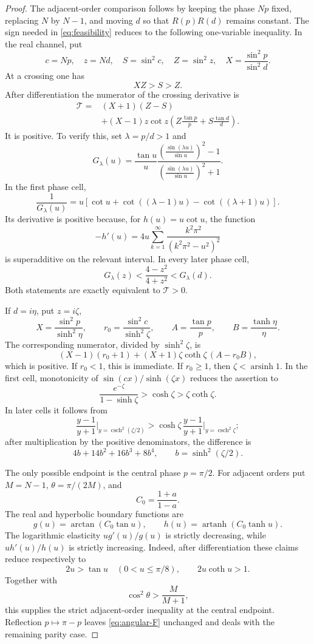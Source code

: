 \documentclass[11pt]{article}
\begin{document}
\begin{proof}
The adjacent-order comparison follows by keeping the phase \(Np\) fixed,
replacing \(N\) by \(N-1\), and moving \(d\) so that \(R(p)R(d)\) remains
constant.  The sign needed in \eqref{eq:feasibility} reduces to the following
one-variable inequality.  In the real channel, put
\[
c=Np,\quad z=Nd,\quad
S=\sin^2c,\quad Z=\sin^2z,\quad
X=\frac{\sin^2p}{\sin^2d}.
\]
At a crossing one has
\[
XZ>S>Z.
\]
After differentiation the numerator of the crossing derivative is
\[
\begin{aligned}
\mathcal T={}&(X+1)(Z-S)\\
&+(X-1)z\cot z
\left(
Z\frac{\tan p}{p}
+
S\frac{\tan d}{d}
\right).
\end{aligned}
\tag{15}\label{eq:T-real}
\]
It is positive.  To verify this, set \(\lambda=p/d>1\) and
\[
G_\lambda(u)
=
\frac{\tan u}{u}
\frac{\left(\frac{\sin(\lambda u)}{\sin u}\right)^2-1}
{\left(\frac{\sin(\lambda u)}{\sin u}\right)^2+1}.
\]
In the first phase cell,
\[
\frac1{G_\lambda(u)}
=
u\left[
\cot u+\cot((\lambda-1)u)-\cot((\lambda+1)u)
\right].
\]
Its derivative is positive because, for \(h(u)=u\cot u\), the function
\[
-h'(u)
=
4u\sum_{k=1}^{\infty}
\frac{k^2\pi^2}{(k^2\pi^2-u^2)^2}
\]
is superadditive on the relevant interval.  In every later phase cell,
\[
G_\lambda(z)
<
\frac{4-z^2}{4+z^2}
<
G_\lambda(d).
\]
Both statements are exactly equivalent to \(\mathcal T>0\).

If \(d=i\eta\), put \(z=i\zeta\),
\[
X=\frac{\sin^2p}{\sinh^2\eta},
\qquad
r_0=\frac{\sin^2c}{\sinh^2\zeta},
\qquad
A=\frac{\tan p}{p},
\qquad
B=\frac{\tanh\eta}{\eta}.
\]
The corresponding numerator, divided by \(\sinh^2\zeta\), is
\[
(X-1)(r_0+1)
+
(X+1)\zeta\coth\zeta\,(A-r_0B),
\tag{16}\label{eq:T-hyp}
\]
which is positive.  If \(r_0<1\), this is immediate.  If \(r_0\geq1\), then
\(\zeta<\operatorname{arsinh}1\).  In the first cell, monotonicity of
\(\sin(cx)/\sinh(\zeta x)\) reduces the assertion to
\[
\frac{e^{-\zeta}}{1-\sinh\zeta}
>
\cosh\zeta
>
\zeta\coth\zeta.
\]
In later cells it follows from
\[
\frac{y-1}{y+1}\bigg|_{y=\operatorname{csch}^2(\zeta/2)}
>
\cosh\zeta\,
\frac{y-1}{y+1}\bigg|_{y=\operatorname{csch}^2\zeta};
\]
after multiplication by the positive denominators, the difference is
\[
4b+14b^2+16b^3+8b^4,
\qquad b=\sinh^2(\zeta/2).
\]

The only possible endpoint is the central phase \(p=\pi/2\).  For adjacent
orders put \(M=N-1\), \(\theta=\pi/(2M)\), and
\[
C_0=\frac{1+a}{1-a}.
\]
The real and hyperbolic boundary functions are
\[
g(u)=\arctan(C_0\tan u),
\qquad
h(u)=\operatorname{artanh}(C_0\tanh u).
\]
The logarithmic elasticity \(ug'(u)/g(u)\) is strictly decreasing, while
\(uh'(u)/h(u)\) is strictly increasing.  Indeed, after differentiation these
claims reduce respectively to
\[
2u>\tan u
\quad(0<u\leq\pi/8),
\qquad
2u\coth u>1.
\]
Together with
\[
\cos^2\theta>\frac{M}{M+1},
\]
this supplies the strict adjacent-order inequality at the central endpoint.
Reflection \(p\mapsto\pi-p\) leaves \eqref{eq:angular-F} unchanged and deals
with the remaining parity case.


\end{proof}
\end{document}
